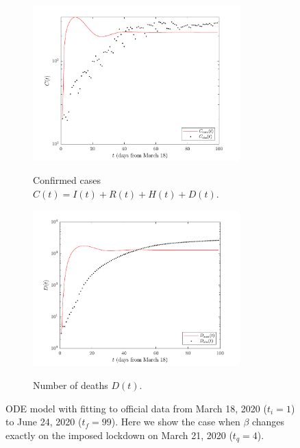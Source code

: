 \documentclass[11pt]{article}
\begin{document}
	\begin{figure}[h!]
		\centering
		\begin{subfigure}{0.5\textwidth}
			\centering
			\includegraphics[height=6cm]{cases}
			\label{fig:ode-cases}
			\caption{Confirmed cases $C(t) = I(t) + R(t) + H(t) + D(t)$.}
		\end{subfigure}%
		\begin{subfigure}{0.5\textwidth}
			\centering
			\includegraphics[height=6cm]{deaths}
			\label{fig:ode-deaths}
			\caption{Number of deaths $D(t)$.}
		\end{subfigure}
		\caption{ODE model with fitting to official data from March 18, 2020 ($t_i = 1$) to June 24, 2020 ($t_f = 99$).
		Here we show the case when $\beta$ changes exactly on the imposed lockdown on March 21, 2020 ($t_q = 4$).}
		\label{fig:ode-results}
	\end{figure}
\end{document}
